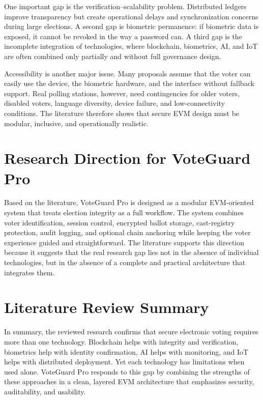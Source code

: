 One important gap is the verification--scalability problem. Distributed ledgers improve transparency but create operational delays and synchronization concerns during large elections. A second gap is biometric permanence: if biometric data is exposed, it cannot be revoked in the way a password can. A third gap is the incomplete integration of technologies, where blockchain, biometrics, AI, and IoT are often combined only partially and without full governance design.

Accessibility is another major issue. Many proposals assume that the voter can easily use the device, the biometric hardware, and the interface without fallback support. Real polling stations, however, need contingencies for older voters, disabled voters, language diversity, device failure, and low-connectivity conditions. The literature therefore shows that secure EVM design must be modular, inclusive, and operationally realistic.

\section{Research Direction for VoteGuard Pro}
Based on the literature, VoteGuard Pro is designed as a modular EVM-oriented system that treats election integrity as a full workflow. The system combines voter identification, session control, encrypted ballot storage, cast-registry protection, audit logging, and optional chain anchoring while keeping the voter experience guided and straightforward. The literature supports this direction because it suggests that the real research gap lies not in the absence of individual technologies, but in the absence of a complete and practical architecture that integrates them.

\section{Literature Review Summary}
In summary, the reviewed research confirms that secure electronic voting requires more than one technology. Blockchain helps with integrity and verification, biometrics help with identity confirmation, AI helps with monitoring, and IoT helps with distributed deployment. Yet each technology has limitations when used alone. VoteGuard Pro responds to this gap by combining the strengths of these approaches in a clean, layered EVM architecture that emphasizes security, auditability, and usability.

\clearpage
